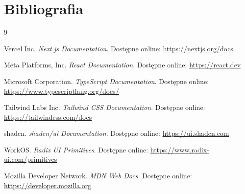 \documentclass[12pt, a4paper]{article}
\begin{document}
\newpage
\section{Bibliografia}

\begin{thebibliography}{9}

Vercel Inc.
\textit{Next.js Documentation}.
Dostępne online: \url{https://nextjs.org/docs}

Meta Platforms, Inc.
\textit{React Documentation}.
Dostępne online: \url{https://react.dev}

Microsoft Corporation.
\textit{TypeScript Documentation}.
Dostępne online: \url{https://www.typescriptlang.org/docs/}

Tailwind Labs Inc.
\textit{Tailwind CSS Documentation}.
Dostępne online: \url{https://tailwindcss.com/docs}

shadcn.
\textit{shadcn/ui Documentation}.
Dostępne online: \url{https://ui.shadcn.com}

WorkOS.
\textit{Radix UI Primitives}.
Dostępne online: \url{https://www.radix-ui.com/primitives}

Mozilla Developer Network.
\textit{MDN Web Docs}.
Dostępne online: \url{https://developer.mozilla.org}

\end{thebibliography}
\end{document}
